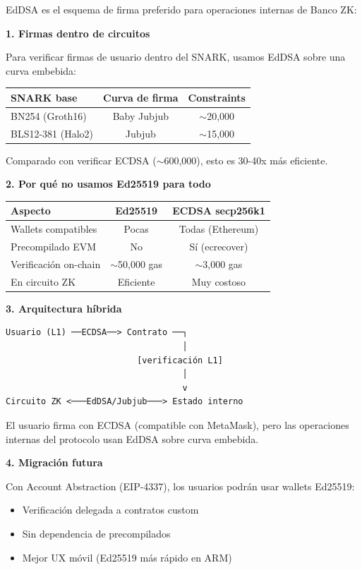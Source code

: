 \documentclass[11pt,a4paper,twoside,openright]{book}
\theoremstyle{definition}
\theoremstyle{plain}
\theoremstyle{remark}
\begin{document}
\begin{bancozk}
EdDSA es el esquema de firma preferido para operaciones internas de Banco ZK:

\textbf{1. Firmas dentro de circuitos}

Para verificar firmas de usuario dentro del SNARK, usamos EdDSA sobre una curva embebida:
\begin{center}
\begin{tabular}{lcc}
\toprule
\textbf{SNARK base} & \textbf{Curva de firma} & \textbf{Constraints} \\
\midrule
BN254 (Groth16) & Baby Jubjub & $\sim$20,000 \\
BLS12-381 (Halo2) & Jubjub & $\sim$15,000 \\
\bottomrule
\end{tabular}
\end{center}

Comparado con verificar ECDSA ($\sim$600,000), esto es 30-40x más eficiente.

\textbf{2. Por qué no usamos Ed25519 para todo}
\begin{center}
\begin{tabular}{lcc}
\toprule
\textbf{Aspecto} & \textbf{Ed25519} & \textbf{ECDSA secp256k1} \\
\midrule
Wallets compatibles & Pocas & Todas (Ethereum) \\
Precompilado EVM & No & Sí (ecrecover) \\
Verificación on-chain & $\sim$50,000 gas & $\sim$3,000 gas \\
En circuito ZK & Eficiente & Muy costoso \\
\bottomrule
\end{tabular}
\end{center}

\textbf{3. Arquitectura híbrida}

\begin{verbatim}
Usuario (L1) ──ECDSA──> Contrato ──┐
                                   │
                          [verificación L1]
                                   │
                                   v
Circuito ZK <───EdDSA/Jubjub───> Estado interno
\end{verbatim}

El usuario firma con ECDSA (compatible con MetaMask), pero las operaciones internas del protocolo usan EdDSA sobre curva embebida.

\textbf{4. Migración futura}

Con Account Abstraction (EIP-4337), los usuarios podrán usar wallets Ed25519:
\begin{itemize}
    \item Verificación delegada a contratos custom
    \item Sin dependencia de precompilados
    \item Mejor UX móvil (Ed25519 más rápido en ARM)
\end{itemize}
\end{bancozk}
\end{document}
